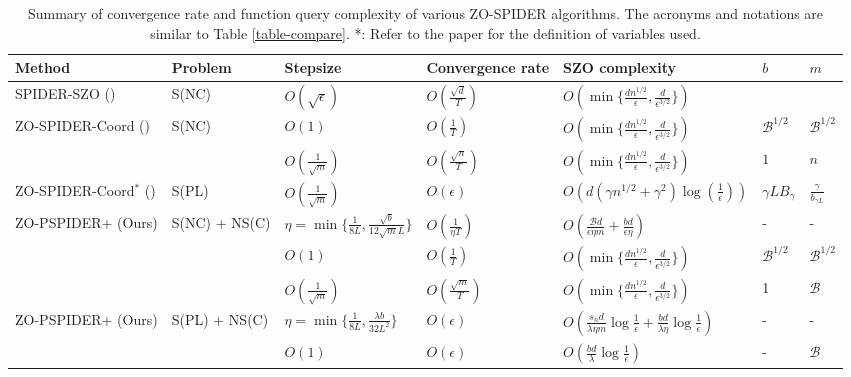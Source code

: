 \documentclass[iicol,sn-basic]{sn-jnl}
\theoremstyle{thmstyleone}%
\theoremstyle{thmstyletwo}%
\theoremstyle{thmstylethree}%
\begin{document}
\begin{table}[htb!]
 \centering
\caption{Summary of convergence rate and function query complexity of various ZO-SPIDER algorithms. The acronyms and notations are similar to Table \ref{table-compare}. *: Refer to the paper for the definition of variables used.}
\label{table-compare-spider}
\begin{adjustbox}{width=1\linewidth,center}
{
\begin{tabular}{ |l|l|l|l|l|l|l| } 
 \hline
 Method & Problem & Stepsize& Convergence rate & SZO complexity & $b$ & $m$ \\
 \hline
 SPIDER-SZO (\cite{fang2018spider}) & S(NC) & $O\left(\sqrt{\epsilon}\right)$ & $O(\frac{\sqrt{d}}{T})$ &$O(\min\{\frac{dn^{1/2}}{\epsilon},\frac{d}{\epsilon^{3/2}}\})$ & &\\
 ZO-SPIDER-Coord (\cite{ji2019improved}) & S(NC) & $O\left(1\right)$ & $O(\frac{1}{T})$ &$O(\min\{\frac{dn^{1/2}}{\epsilon},\frac{d}{\epsilon^{3/2}}\})$ & $\mathcal{B}^{1/2}$ & $\mathcal{B}^{1/2}$ \\
 &  & $O\left(\frac{1}{\sqrt{m}}\right)$ & $O(\frac{\sqrt{n}}{T})$ &$O(\min\{\frac{dn^{1/2}}{\epsilon},\frac{d}{\epsilon^{3/2}}\})$ & $1$ & $n$\\
 ZO-SPIDER-Coord$^*$ (\cite{ji2019improved}) & S(PL) & $O\left(\frac{1}{\sqrt{m}}\right)$ & $O(\epsilon)$ & $O(d(\gamma n^{1/2} + \gamma^2)\log(\frac{1}{\epsilon}))$ & $\gamma L B_{\gamma}$ & $\frac{\gamma}{b_{\gamma L}}$ \\
 ZO-PSPIDER+ (Ours) & S(NC) + NS(C) & $\eta = \min\{\frac{1}{8L}, \frac{\sqrt{b}}{12 \sqrt{m}L}\}$ & $O\left(\frac{1}{\eta T}\right)$ & $O\left(\frac{\mathcal{B}d}{\epsilon\eta m}+\frac{bd}{\epsilon\eta}\right)$ & - & -\\
  &  & $O\left(1\right)$ & $O\left(\frac{1}{T}\right)$ & $O(\min\{\frac{dn^{1/2}}{\epsilon},\frac{d}{\epsilon^{3/2}}\})$ & $\mathcal{B}^{1/2}$ & $\mathcal{B}^{1/2}$ \\
  &  & $O\left(\frac{1}{\sqrt{m}}\right)$ & $O\left(\frac{\sqrt{m}}{T}\right)$ & $O(\min\{\frac{dn^{1/2}}{\epsilon},\frac{d}{\epsilon^{3/2}}\})$ & 1 & $\mathcal{B}$ \\
 ZO-PSPIDER+ (Ours) & S(PL) + NS(C) & $\eta = \min\{\frac{1}{8L}, \frac{\lambda b}{32 L^2}\}$ & $O(\epsilon)$ & $O(\frac{s_n d}{\lambda\eta m}\log\frac{1}{\epsilon}+\frac{b d }{\lambda\eta}\log\frac{1}{\epsilon})$ & - & -\\
  &  & $ O(1)$ & $O(\epsilon)$ & $O(\frac{bd}{\lambda}\log\frac{1}{\epsilon})$ & - & $\mathcal{B}$ \\
 \bottomrule
\end{tabular}
}\end{adjustbox}
\end{table}
\end{document}
